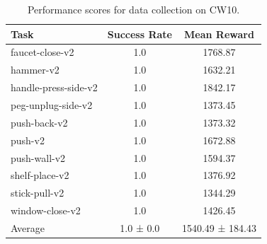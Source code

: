 \begin{table}[]
    \centering
    \caption{Performance scores for data collection on CW10.}
    \begin{tabular}{l c c}
    \toprule
                    \textbf{Task} & \textbf{Success Rate} &      \textbf{Mean Reward} \\
    \midrule
         faucet-close-v2 &    1.0 &    1768.87 \\
               hammer-v2 &    1.0 &    1632.21 \\
    handle-press-side-v2 &    1.0 &    1842.17 \\
      peg-unplug-side-v2 &    1.0 &    1373.45 \\
            push-back-v2 &    1.0 &    1373.32 \\
                 push-v2 &    1.0 &    1672.88 \\
            push-wall-v2 &    1.0 &    1594.37 \\
          shelf-place-v2 &    1.0 &    1376.92 \\
           stick-pull-v2 &    1.0 &    1344.29 \\
         window-close-v2 &    1.0 &    1426.45 \\
    \midrule
                 Average &    1.0 ± 0.0 & 1540.49 ± 184.43 \\
    \bottomrule
    \end{tabular}
    \label{tab:cw10}
\end{table}

